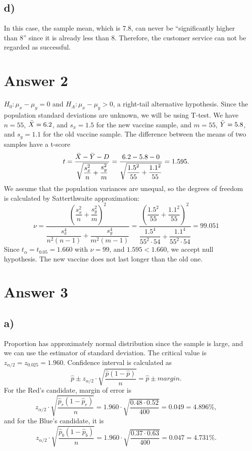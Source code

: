\documentclass[12pt]{article}
\begin{document}
\subsection*{d)}
\noindent In this case, the sample mean, which is 7.8, can never be ``significantly higher than 8'' since it is already less than 8. Therefore, the customer service can not be regarded as successful.

\section*{Answer 2}
\noindent $H_0: \mu_x - \mu_y = 0$ and $H_A: \mu_x - \mu_y > 0$, a right-tail alternative hypothesis. Since the population standard deviations are unknown, we will be using T-test. We have $n = 55$, $\Bar{X} = 6.2$, and $s_x = 1.5$ for the new vaccine sample, and $m = 55$, $\Bar{Y} = 5.8$, and $s_y = 1.1$ for the old vaccine sample. The difference between the means of two samples have a t-score
\[ t = \frac{\Bar{X} - \Bar{Y} - D}{\sqrt{\dfrac{s_x^2}{n} + \dfrac{s_y^2}{m}}} = \frac{6.2 - 5.8 - 0}{\sqrt{\dfrac{1.5^2}{55} + \dfrac{1.1^2}{55}}} = 1.595. \]
We assume that the population variances are unequal, so the degrees of freedom is calculated by Satterthwaite approximation:
\[ \nu = \frac{\left( \dfrac{s_x^2}{n} + \dfrac{s_y^2}{m} \right)^2}{\dfrac{s_x^4}{n^2 (n - 1)} + \dfrac{s_y^4}{m^2 (m - 1)}} = \frac{\left( \dfrac{1.5^2}{55} + \dfrac{1.1^2}{55} \right)^2}{\dfrac{1.5^4}{55^2 \cdot 54} + \dfrac{1.1^4}{55^2 \cdot 54}} = 99.051 \]
Since $t_{\alpha} = t_{0.05} = 1.660$ with $\nu = 99$, and $1.595 < 1.660$, we accept null hypothesis. The new vaccine does not last longer than the old one.

\section*{Answer 3}
\subsection*{a)}
\noindent Proportion has approximately normal distribution since the sample is large, and we can use the estimator of standard deviation. The critical value is $z_{\alpha / 2} = z_{0.025} = 1.960$. Confidence interval is calculated as
\[ \hat{p} \pm z_{\alpha / 2} \cdot \sqrt{\frac{\hat{p} (1 - \hat{p})}{n}} = \hat{p} \pm margin. \]
For the Red's candidate, margin of error is
\[ z_{\alpha / 2} \cdot \sqrt{\frac{\hat{p}_{r} (1 - \hat{p}_{r})}{n}} = 1.960 \cdot \sqrt{\frac{0.48 \cdot 0.52}{400}} = 0.049 = 4.896\%, \]
and for the Blue's candidate, it is
\[ z_{\alpha / 2} \cdot \sqrt{\frac{\hat{p}_{b} (1 - \hat{p}_{b})}{n}} = 1.960 \cdot \sqrt{\frac{0.37 \cdot 0.63}{400}} = 0.047 = 4.731\%. \]
\end{document}
